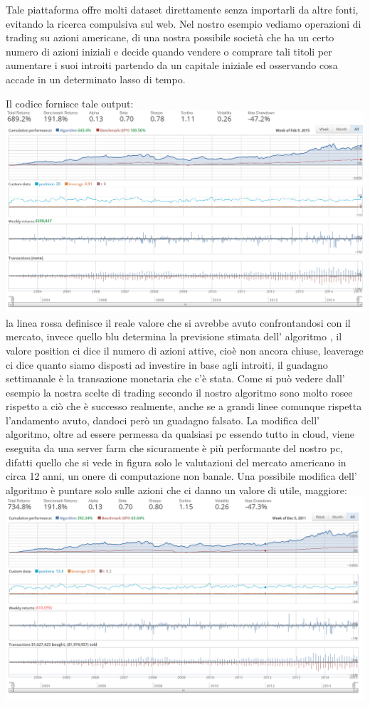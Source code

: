 			\par 
			Tale piattaforma offre molti dataset direttamente senza importarli da altre fonti, evitando la ricerca compulsiva sul web. Nel nostro esempio vediamo operazioni di trading su azioni americane, di una nostra possibile società che ha un certo numero di azioni iniziali e decide quando vendere o comprare tali titoli per aumentare i suoi introiti partendo da un capitale iniziale ed osservando cosa accade in un determinato lasso di tempo.
			\par 
			Il codice fornisce tale output:
			\includegraphics[width=1.0\textwidth, height=0.40\textheight]{inizio.png} 
			la linea rossa definisce il reale valore che si avrebbe avuto confrontandosi con il mercato, invece quello blu determina la previsione stimata dell' algoritmo , il valore position ci dice il numero di azioni attive, cioè non ancora chiuse, leaverage ci dice quanto siamo disposti ad investire in base agli introiti,%
			il guadagno settimanale è la transazione monetaria che c'è stata.
			Come si può vedere dall' esempio la nostra scelte di trading secondo il nostro algoritmo sono molto rosee rispetto a ciò che è successo realmente, anche se a grandi linee comunque rispetta l'andamento avuto, dandoci però un guadagno falsato.
			La modifica dell' algoritmo, oltre ad essere permessa da qualsiasi pc essendo tutto in cloud, viene eseguita da una server farm che sicuramente è più performante del nostro pc, difatti quello che si vede in figura solo le valutazioni del mercato americano in circa 12 anni, un onere di computazione non banale.
			Una possibile modifica dell' algoritmo è  puntare solo sulle azioni che ci danno un valore di utile, maggiore:
			\includegraphics[width=1.0\textwidth, height=0.40\textheight]{factorfilter0,1.png} 
